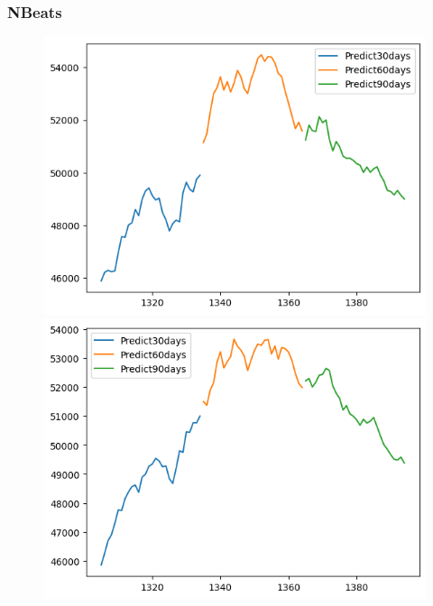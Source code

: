 

\subsubsection{NBeats}
\begin{figure}[H]
    \centering
    \begin{minipage}{0.15\textwidth}
    \centering
    \includegraphics[width=1\textwidth]{resources/chapter-5/newdata1/predicted/BIDV_NBeats_7-3_30days.png}
    \end{minipage}
    \hfill
    \begin{minipage}{0.15\textwidth}
    \centering
    \includegraphics[width=1\textwidth]{resources/chapter-5/newdata1/predicted/BIDV_NBeats_8-2_30days.png}

\end{minipage}
\end{figure}
